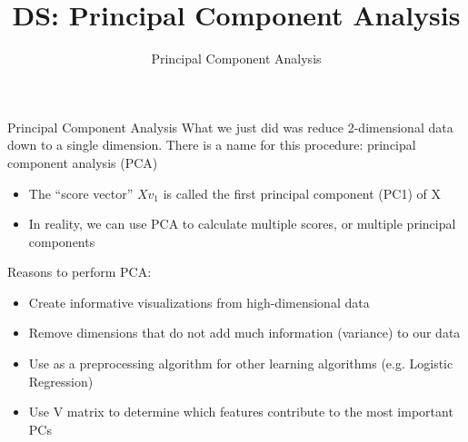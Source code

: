 \documentclass[aspectratio=169]{../latex_main/tntbeamer}  %
\title[Introduction]{DS: Principal Component Analysis}
\subtitle{Principal Component Analysis}
\begin{document}
	
	\maketitle
	\begin{frame}{Principal Component Analysis}
	    What we just did was reduce 2-dimensional data down to a single dimension.
        There is a name for this procedure: principal component analysis (PCA)
        \begin{itemize}
            \item The “score vector” 	$Xv_1$	is called the first principal component (PC1) of X
            \item In reality, we can use PCA to calculate multiple scores, or multiple principal components
        \end{itemize}
        \bigskip
        Reasons to perform PCA:
        \begin{itemize}
            \item Create informative visualizations from high-dimensional data
            \item Remove dimensions that do not add much information (variance) to our data
            \item Use as a preprocessing algorithm for other learning algorithms (e.g. Logistic Regression)
            \item Use V matrix to determine which features contribute to the most important PCs
        \end{itemize}
	\end{frame}
	
\end{document}
